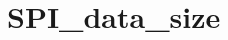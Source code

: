 \hypertarget{group___s_p_i__data__size}{\section{S\-P\-I\-\_\-data\-\_\-size}
\label{group___s_p_i__data__size}
}
